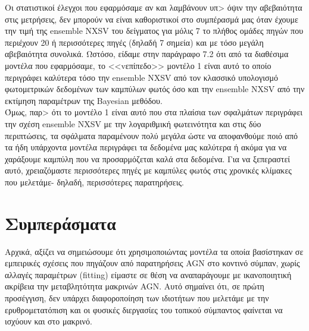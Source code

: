Οι στατιστικοί έλεγχοι που εφαρμόσαμε αν και λαμβάνουν υπ> όψιν την αβεβαιότητα στις μετρήσεις, δεν μπορούν να είναι καθοριστικοί στο συμπέρασμά μας όταν έχουμε την τιμή της \textlatin{ensemble NXSV} του δείγματος για μόλις 7 το πλήθος ομάδες πηγών που περιέχουν 20 ή περισσότερες πηγές (δηλαδή 7 σημεία) και με τόσο μεγάλη αβεβαιότητα συνολικά. Ωστόσο, είδαμε στην παράγραφο 7.2 ότι από τα διαθέσιμα μοντέλα που εφαρμόσαμε, το <<vεπίπεδο>> μοντέλο 1 είναι αυτό το οποίο περιγράφει καλύτερα τόσο την \textlatin{ensemble NXSV} από τον κλασσικό υπολογισμό φωτομετρικών δεδομένων των καμπύλων φωτός όσο και την \textlatin{ensemble NXSV} από την εκτίμηση παραμέτρων της \textlatin{Bayesian} μεθόδου.\\
Όμως, παρ> ότι το μοντέλο 1 είναι αυτό που στα πλαίσια των σφαλμάτων περιγράφει την σχέση \textlatin{ensemble NXSV} με την λογαριθμική φωτεινότητα και στις δύο περιπτώσεις, τα σφάλματα παραμένουν πολύ μεγάλα ώστε να αποφανθούμε ποιό από τα ήδη υπάρχοντα μοντέλα περιγράφει τα δεδομένα μας καλύτερα ή ακόμα για να χαράξουμε καμπύλη που να προσαρμόζεται καλά στα δεδομένα. Για να ξεπεραστεί αυτό, χρειαζόμαστε περισσότερες πηγές με καμπύλες φωτός στις χρονικές κλίμακες που μελετάμε- δηλαδή, περισσότερες παρατηρήσεις. 

\section{Συμπεράσματα}
Αρχικά, αξίζει να σημειώσουμε ότι χρησιμοποιώντας μοντέλα τα οποία βασίστηκαν σε εμπειρικές σχέσεις που πηγάζουν από παρατηρήσεις \textlatin{AGN} στο κοντινό σύμπαν, χωρίς αλλαγές παραμέτρων (\textlatin{fitting}) είμαστε σε θέση να αναπαράγουμε με ικανοποιητική ακρίβεια την μεταβλητότητα μακρινών \textlatin{AGN}. Αυτό σημαίνει ότι, σε πρώτη προσέγγιση, δεν υπάρχει διαφοροποίηση των ιδιοτήτων που μελετάμε με την ερυθρομετατόπιση και οι φυσικές διεργασίες του τοπικού σύμπαντος φαίνεται να ισχύουν και στο μακρινό.

